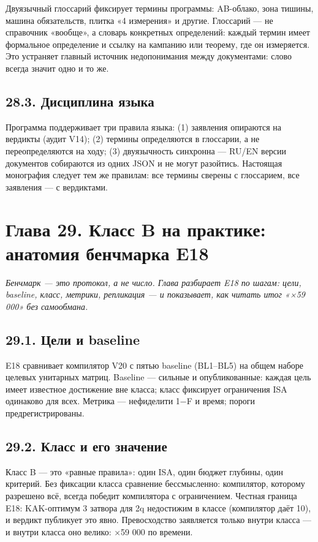 \documentclass[11pt,a4paper]{article}
\begin{document}
Двуязычный глоссарий фиксирует термины программы: AB-облако, зона тишины, машина обязательств, плитка «4 измерения» и другие. Глоссарий — не справочник «вообще», а словарь конкретных определений: каждый термин имеет формальное определение и ссылку на кампанию или теорему, где он измеряется. Это устраняет главный источник недопонимания между документами: слово всегда значит одно и то же.

\subsection{28.3. Дисциплина языка}

Программа поддерживает три правила языка: (1) заявления опираются на вердикты (аудит V14); (2) термины определяются в глоссарии, а не переопределяются на ходу; (3) двуязычность синхронна — RU/EN версии документов собираются из одних JSON и не могут разойтись. Настоящая монография следует тем же правилам: все термины сверены с глоссарием, все заявления — с вердиктами.

\section{Глава 29. Класс B на практике: анатомия бенчмарка E18}

\noindent\textit{\color{copper}Бенчмарк — это протокол, а не число. Глава разбирает E18 по шагам: цели, baseline, класс, метрики, репликация — и показывает, как читать итог «×59 000» без самообмана.}

\subsection{29.1. Цели и baseline}

E18 сравнивает компилятор V20 с пятью baseline (BL1–BL5) на общем наборе целевых унитарных матриц. Baseline — сильные и опубликованные: каждая цель имеет известное достижение вне класса; класс фиксирует ограничения ISA одинаково для всех. Метрика — нефиделити 1−F и время; пороги предрегистрированы.

\subsection{29.2. Класс и его значение}

Класс B — это «равные правила»: один ISA, один бюджет глубины, один критерий. Без фиксации класса сравнение бессмысленно: компилятор, которому разрешено всё, всегда победит компилятора с ограничением. Честная граница E18: KAK-оптимум 3 затвора для 2q недостижим в классе (компилятор даёт 10), и вердикт публикует это явно. Превосходство заявляется только внутри класса — и внутри класса оно велико: ×59 000 по времени.
\end{document}
